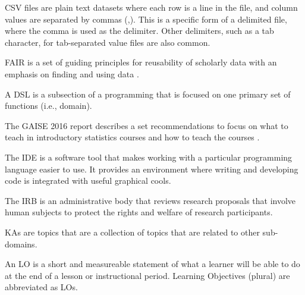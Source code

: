 \documentclass[../main.tex]{subfiles}
\begin{document}


  CSV files are plain text datasets where each row is a line in the file,
  and column values are separated by commas (,).
  This is a specific form of a delimited file, where the comma is used as the delimiter.
  Other delimiters, such as a tab character, for tab-separated value files are also common.



  FAIR is a set of guiding principles for reusability of scholarly data with an emphasis on finding and using data
  \cite{wilkinsonFAIRGuidingPrinciples2016}.



  A DSL is a subsection of a programming that is focused on one primary set of functions (i.e., domain).



  The GAISE 2016 report describes a set recommendations to focus on
  what to teach in introductory statistics courses and
  how to teach the courses
  \cite{gaise2016}.



  The IDE is a software tool that makes working with a particular programming language easier to use.
  It provides an environment where writing and developing code is integrated with useful
  graphical cools.



  The IRB is an administrative body that reviews research proposals that involve human subjects to protect the rights and welfare of
  research participants.



  KAs are topics that are a collection of topics that are related to other sub-domains.



  An LO is a short and measureable statement of what a learner will be able to do at the end of a lesson or instructional period.
  Learning Objectives (plural) are abbreviated as LOs.

\end{document}
